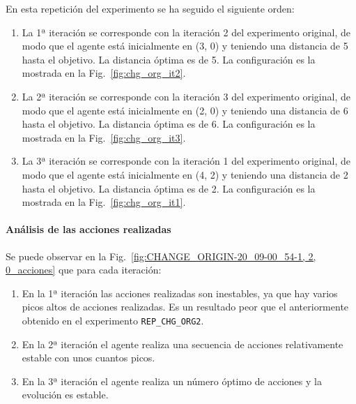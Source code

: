 En esta repetición del experimento se ha seguido el siguiente orden: 
\begin{enumerate}
    \item La 1ª iteración se corresponde con la iteración 2 del experimento original,  de modo que el agente está inicialmente en (3, 0) y teniendo una distancia de 5 hasta el objetivo. La distancia óptima es de 5. La configuración es la mostrada en la Fig.~\ref{fig:chg_org_it2}.
    \item La 2ª iteración se corresponde con la iteración 3 del experimento original, de modo que el agente está inicialmente en (2, 0) y teniendo una distancia de 6 hasta el objetivo. La distancia óptima es de 6. La configuración es la mostrada en la Fig.~\ref{fig:chg_org_it3}.
    \item La 3ª iteración se corresponde con la iteración 1 del experimento original, de modo que el agente está inicialmente en (4, 2) y teniendo una distancia de 2 hasta el objetivo. La distancia óptima es de 2. La configuración es la mostrada en la Fig.~\ref{fig:chg_org_it1}.
\end{enumerate}

\paragraph{Análisis de las acciones realizadas}

Se puede observar en la Fig.~\ref{fig:CHANGE_ORIGIN-20_09-00_54-1, 2, 0_acciones} que para cada iteración: 
\begin{enumerate}
    \item En la 1ª iteración las acciones realizadas son inestables, ya que hay varios picos altos de acciones realizadas. Es un resultado peor que el anteriormente obtenido en el experimento \texttt{REP\_CHG\_ORG2}.
    \item En la 2ª iteración el agente realiza una secuencia de acciones relativamente estable con unos cuantos picos. 
    \item En la 3ª iteración el agente realiza un número óptimo de acciones y la evolución es estable.
\end{enumerate}

